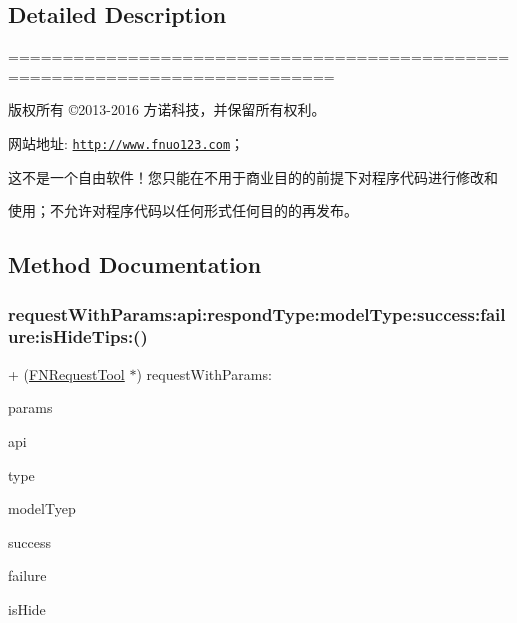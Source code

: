 \subsection{Detailed Description}
============================================================================

版权所有 ©2013-\/2016 方诺科技，并保留所有权利。

网站地址\+: \href{http://www.fnuo123.com}{\tt http\+://www.\+fnuo123.\+com}； 



这不是一个自由软件！您只能在不用于商业目的的前提下对程序代码进行修改和

使用；不允许对程序代码以任何形式任何目的的再发布。 

 

\subsection{Method Documentation}
\mbox{\label{interface_f_n_request_tool_ade9c4f4584cedc9dce2e4ef06b604de0}} 
\subsubsection{\texorpdfstring{request\+With\+Params\+:api\+:respond\+Type\+:model\+Type\+:success\+:failure\+:is\+Hide\+Tips\+:()}{requestWithParams:api:respondType:modelType:success:failure:isHideTips:()}}
{\footnotesize\ttfamily + (\mbox{\hyperlink{interface_f_n_request_tool}{F\+N\+Request\+Tool}} $\ast$) request\+With\+Params\+: \begin{DoxyParamCaption}\item[{(N\+S\+Mutable\+Dictionary $\ast$)}]{params }\item[{api:(N\+S\+String$\ast$)}]{api }\item[{respondType:(Response\+Type)}]{type }\item[{modelType:(N\+S\+String$\ast$)}]{model\+Tyep }\item[{success:(Request\+Success)}]{success }\item[{failure:(Request\+Failure)}]{failure }\item[{isHideTips:(B\+O\+OL)}]{is\+Hide }\end{DoxyParamCaption}}

